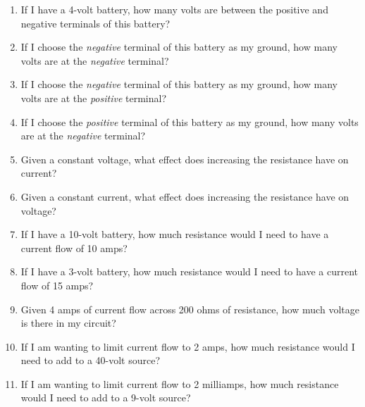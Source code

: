 
\begin{enumerate}
\item If I have a 4-volt battery, how many volts are between the positive and negative terminals of this battery?
\item If I choose the \emph{negative} terminal of this battery as my ground, how many volts are at the \emph{negative} terminal?
\item If I choose the \emph{negative} terminal of this battery as my ground, how many volts are at the \emph{positive} terminal?
\item If I choose the \emph{positive} terminal of this battery as my ground, how many volts are at the \emph{negative} terminal?
\item Given a constant voltage, what effect does increasing the resistance have on current?
\item Given a constant current, what effect does increasing the resistance have on voltage?
\item If I have a 10-volt battery, how much resistance would I need to have a current flow of 10 amps?
\item If I have a 3-volt battery, how much resistance would I need to have a current flow of 15 amps?
\item Given 4 amps of current flow across 200 ohms of resistance, how much voltage is there in my circuit?
\item If I am wanting to limit current flow to 2 amps, how much resistance would I need to add to a 40-volt source?
\item If I am wanting to limit current flow to 2 milliamps, how much resistance would I need to add to a 9-volt source?
\end{enumerate}
